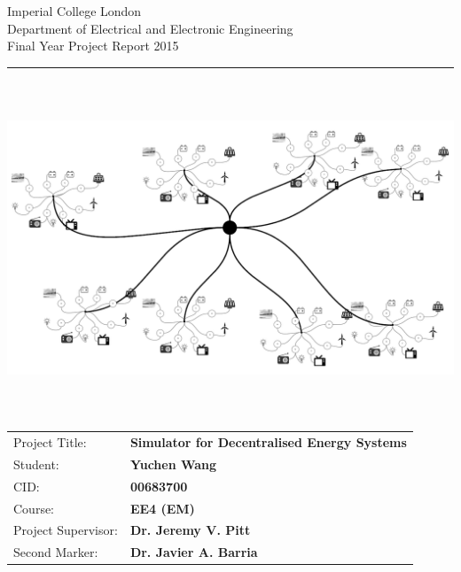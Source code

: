 \documentclass[11pt,a4paper,twoside]{memoir} %
\begin{document}
%
\begin{titlingpage}
                \setlength{\parindent}{0pt}
                \setlength{\parskip}{0pt}

                {
                                \Large
                                \raggedright
                                Imperial College London\\[17pt]
                                Department of Electrical and Electronic Engineering\\[17pt]
                                Final Year Project Report 2015\\[17pt]
 
                }

                \rule{\columnwidth}{3pt}
                \vfill
                \centering
                \includegraphics[width=1\columnwidth,height=100mm,keepaspectratio]{Images/Model2.png}
                \vfill
                \setlength{\tabcolsep}{0pt}

                \begin{tabular}{p{40mm}p{\dimexpr\columnwidth-40mm}}
                                Project Title: & \textbf{Simulator for Decentralised Energy Systems} \\[12pt]
                                Student: & \textbf{Yuchen Wang} \\[12pt]
                                CID: & \textbf{00683700} \\[12pt]
                                Course: & \textbf{EE4 (EM)} \\[12pt]
                                Project Supervisor: & \textbf{Dr. Jeremy V. Pitt} \\[12pt]
                                Second Marker: & \textbf{Dr. Javier A. Barria} \\
                \end{tabular}
\end{titlingpage}
\end{document}
